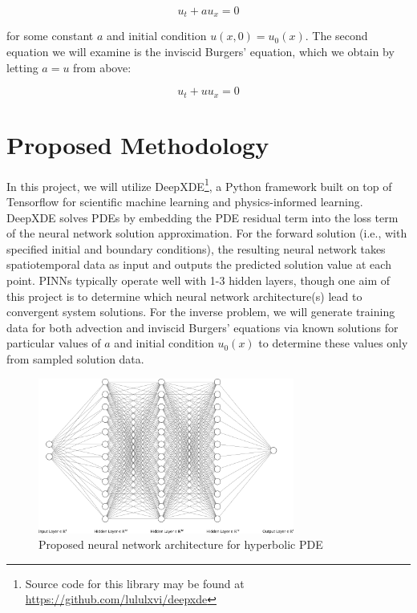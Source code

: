\documentclass[letterpaper,12pt]{article}
\begin{document}
    $$
    u_t + a u_x = 0
    $$

    \noindent for some constant $a$ and initial condition $u(x, 0) = u_0(x)$. The second equation we will examine is the
    inviscid Burgers' equation, which we obtain by letting $a = u$ from above:

    $$
    u_t + u u_x = 0
    $$

    \section{Proposed Methodology}\label{sec:proposed-methodology}

    In this project, we will utilize DeepXDE\footnote{
        Source code for this library may be found at
        \hyperlink{https://github.com/lululxvi/deepxde}{https://github.com/lululxvi/deepxde}
    }, a Python framework built on top of Tensorflow for scientific machine learning and physics-informed 
    learning.\cite{lu_deepxde_2021} DeepXDE solves PDEs by embedding the PDE residual term into the loss term of the
    neural network solution approximation. For the forward solution (i.e., with specified initial and boundary 
    conditions), the resulting neural network takes spatiotemporal data as input and outputs the predicted solution 
    value at each point. PINNs typically operate well with 1-3 hidden layers, though one aim of this project is to 
    determine which neural network architecture(s) lead to convergent system solutions. For the inverse problem, we will
    generate training data for both advection and inviscid Burgers' equations via known solutions for particular values
    of $a$ and initial condition $u_0(x)$ to determine these values only from sampled solution data.

    \begin{figure}[h]
        \centering
        \includegraphics[width=0.75\textwidth]{nn.png}
        \caption{Proposed neural network architecture for hyperbolic PDE}
    \end{figure}
\end{document}
